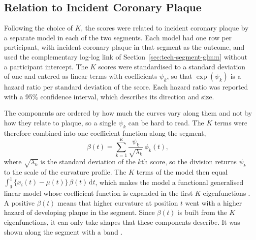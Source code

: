 \subsection{Relation to Incident Coronary Plaque}

Following the choice of $K$, the scores were related to incident coronary plaque by a separate model in each of the two segments.
Each model had one row per participant, with incident coronary plaque in that segment as the outcome, and used the complementary log-log link of Section~\ref{sec:tech-segment-glmm} without a participant intercept.
The $K$ scores were standardised to a standard deviation of one and entered as linear terms with coefficients $\psi_k$, so that $\exp(\psi_k)$ is a hazard ratio per standard deviation of the score.
Each hazard ratio was reported with a 95\% confidence interval, which describes its direction and size.

The components are ordered by how much the curves vary along them and not by how they relate to plaque, so a single $\psi_k$ can be hard to read.
The $K$ terms were therefore combined into one coefficient function along the segment,
\begin{equation}
  \beta(t) = \sum_{k=1}^{K} \frac{\psi_k}{\sqrt{\lambda_k}}\, \phi_k(t) ,
  \label{eq:method-fpca-beta}
\end{equation}
where $\sqrt{\lambda_k}$ is the standard deviation of the $k$th score, so the division returns $\psi_k$ to the scale of the curvature profile.
The $K$ terms of the model then equal $\int_0^1 \{ x_i(t) - \mu(t) \}\, \beta(t)\, \mathrm{d}t$, which makes the model a functional generalised linear model whose coefficient function is expanded in the first $K$ eigenfunctions \cite{wang2016fda}.
A positive $\beta(t)$ means that higher curvature at position $t$ went with a higher hazard of developing plaque in the segment.
Since $\beta(t)$ is built from the $K$ eigenfunctions, it can only take shapes that these components describe.
It was shown along the segment with a band .
